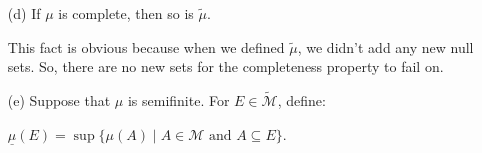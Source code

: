 \documentclass{book}
\newcommand{\exTwoP}{%
   \color{RedViolet}%
   \fontsize{13}{15}\selectfont%
}
\newenvironment{myIndent}{%
   \begin{adjustwidth}{2.5em}{0em}%
}{%
   \end{adjustwidth}%
}
\newcommand{\retTwo}{\hfill\bigbreak}
\begin{document}
\begin{enumerate}
   \begin{myIndent}\exTwoP
      Since $\emptyset \in \mathcal{M}$, we know $\widetilde{\mu}(\emptyset) = \mu(\emptyset) = 0$.\newpage 

      Note that if $A, B \in \widetilde{\mathcal{M}}$ with $A \subseteq B$ and $A \notin \mathcal{M}$ but $B \in \mathcal{M}$, then we\\ immediately get a contradiction since that would suggest $A = A \cap B \in \mathcal{M}$. As a result, supposing $(E_j)_{j \in \mathbb{N}}$ is a sequence of disjoint sets in $\widetilde{\mathcal{M}}$, we have that if any $E_j \notin \mathcal{M}$, then:\\ [-22pt]
      
      {\centering$\widetilde{\mu}(\bigcup\limits_{j \in \mathbb{N}}E_j) = \infty = \sum\limits_{j =1}^\infty \widetilde{\mu}(E_j)$.\retTwo\par}

      Meanwhile, if all sets of $(E_j)_{j \in \mathbb{N}}$ are in $\mathcal{M}$, then:\\ [-16pt]

      {\centering$\widetilde{\mu}(\bigcup\limits_{j \in \mathbb{N}}E_j) = \mu(\bigcup\limits_{j \in \mathbb{N}}E_j) = \sum\limits_{j =1}^\infty \mu(E_j) = \sum\limits_{j =1}^\infty \widetilde{\mu}(E_j)$.\retTwo\par}

		This proves that $\widetilde{\mu}$ is a measure. Meanwhile, to show that $\widetilde{\mu}$ is saturated, note that since we didn't add any sets of finite measure to $\widetilde{\mathcal{M}}$, we have that a set $E \subseteq X$ is locally $\mu$-measurable iff it is locally $\widetilde{\mu}$-measurable.
   \end{myIndent}

   \item[(d)] If $\mu$ is complete, then so is $\widetilde{\mu}$.
   
   \begin{myIndent}\exTwoP
      This fact is obvious because when we defined $\widetilde{\mu}$, we didn't add any new null sets. So, there are no new sets for the completeness property to fail on.
   \end{myIndent}

   \item[(e)] Suppose that $\mu$ is semifinite. For $E \in \widetilde{\mathcal{M}}$, define:
   
   {\centering $\underline{\mu}(E) = \sup \{\mu(A) \mid A \in \mathcal{M} \text{ and } A \subseteq E \}$.\par}


\end{enumerate}
\end{document}
